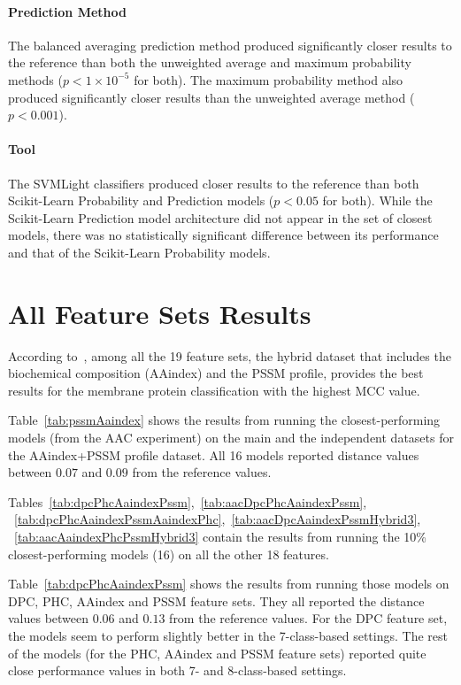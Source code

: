 \paragraph{Prediction Method}
The balanced averaging prediction method produced significantly closer results to the reference than both the
unweighted average and maximum probability methods ($p < 1\times 10^{-5}$ for both). The maximum probability method
also produced significantly closer results than the unweighted average method ($p < 0.001$).

\paragraph{Tool}
The SVMLight classifiers produced closer results to the reference than both Scikit-Learn Probability and Prediction models
($p < 0.05$ for both). While the Scikit-Learn Prediction model architecture did not appear in the set of closest models,
there was no statistically significant difference between its performance and that of the Scikit-Learn Probability models.

\section{All Feature Sets Results}
According to~\cite{mishra_prediction_2014}, among all the 19 feature sets, the hybrid dataset 
that includes the biochemical composition (AAindex) and the PSSM profile, provides the best 
results for the membrane protein classification with the highest MCC value.

Table~\ref{tab:pssmAaindex} shows the results from running the closest-performing models 
(from the AAC experiment) on the main and the independent datasets for the AAindex+PSSM 
profile dataset. All 16 models reported distance values between $0.07$ and $0.09$ from 
the reference values. 

Tables~\ref{tab:dpcPhcAaindexPssm},~\ref{tab:aacDpcPhcAaindexPssm},
~\ref{tab:dpcPhcAaindexPssmAaindexPhc},~\ref{tab:aacDpcAaindexPssmHybrid3},
~\ref{tab:aacAaindexPhcPssmHybrid3} 
contain the results from running the 10\% closest-performing models (16) on all the other 
18 features.

Table~\ref{tab:dpcPhcAaindexPssm} shows the results from running those models on DPC, 
PHC, AAindex and PSSM feature sets. They all reported the distance values 
between $0.06$ and $0.13$ from the reference values. For the DPC feature set, the models 
seem to perform slightly better in the 7-class-based settings. The rest of the models 
(for the PHC, AAindex and PSSM feature sets) reported quite close performance values 
in both 7- and 8-class-based settings.


